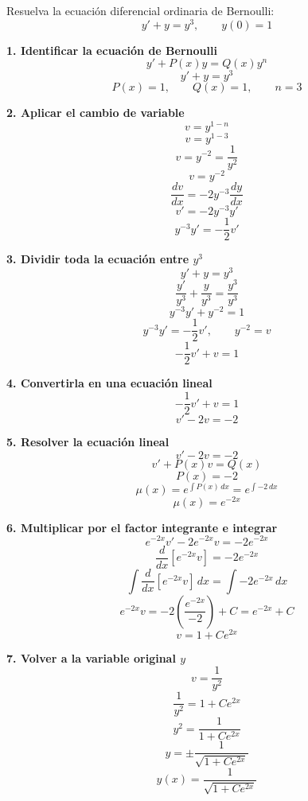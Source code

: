 \documentclass[11pt,a4paper]{article}
\newenvironment{solucion}[1][Solución Detallada]{%
    \vspace{1.5mm}%
    \noindent{\large\textbf{Solución:}}\par\vspace{1.5mm}%
}{%
    \par\vspace{3mm}%
}
\begin{document}
\vspace{3mm}

\begin{problema}[Problema 1.2]
Resuelva la ecuación diferencial ordinaria de Bernoulli:
\[
y' + y = y^3, \qquad y(0) = 1
\]
\end{problema}

\begin{solucion}

\textbf{\large 1. Identificar la ecuación de Bernoulli}
\[
\boxed{y' + P(x)y = Q(x)y^n}
\]
\[
y' + y = y^3
\]
\[
P(x) = 1, \qquad Q(x) = 1, \qquad n = 3
\]

\vspace{3.5mm}

\textbf{\large 2. Aplicar el cambio de variable}
\[
\boxed{v = y^{1-n}}
\]
\[
v = y^{1-3}
\]
\[
\boxed{v = y^{-2} = \frac{1}{y^2}}
\]
\[
v = y^{-2}
\]
\[
\frac{dv}{dx} = -2y^{-3} \frac{dy}{dx}
\]
\[
\boxed{v' = -2y^{-3}y'}
\]
\[
\boxed{y^{-3}y' = -\frac{1}{2}v'}
\]

\vspace{3.5mm}

\textbf{\large 3. Dividir toda la ecuación entre $y^3$}
\[
y' + y = y^3
\]
\[
\frac{y'}{y^3} + \frac{y}{y^3} = \frac{y^3}{y^3}
\]
\[
y^{-3}y' + y^{-2} = 1
\]
\[
y^{-3}y' = -\frac{1}{2}v', \qquad y^{-2} = v
\]
\[
-\frac{1}{2}v' + v = 1
\]

\vspace{3.5mm}

\textbf{\large 4. Convertirla en una ecuación lineal}
\[
-\frac{1}{2}v' + v = 1
\]
\[
\boxed{v' - 2v = -2}
\]

\vspace{3.5mm}

\textbf{\large 5. Resolver la ecuación lineal}
\[
v' - 2v = -2
\]
\[
v' + P(x)v = Q(x)
\]
\[
P(x) = -2
\]
\[
\mu(x) = e^{\int P(x)\,dx} = e^{\int -2\,dx}
\]
\[
\boxed{\mu(x) = e^{-2x}}
\]

\vspace{3.5mm}

\textbf{\large 6. Multiplicar por el factor integrante e integrar}
\[
e^{-2x}v' - 2e^{-2x}v = -2e^{-2x}
\]
\[
\frac{d}{dx}\left[e^{-2x}v\right] = -2e^{-2x}
\]
\[
\int \frac{d}{dx}\left[e^{-2x}v\right]\,dx = \int -2e^{-2x}\,dx
\]
\[
e^{-2x}v = -2\left(\frac{e^{-2x}}{-2}\right) + C = e^{-2x} + C
\]
\[
\boxed{v = 1 + C e^{2x}}
\]

\vspace{3.5mm}

\textbf{\large 7. Volver a la variable original $y$}
\[
v = \frac{1}{y^2}
\]
\[
\frac{1}{y^2} = 1 + C e^{2x}
\]
\[
y^2 = \frac{1}{1 + C e^{2x}}
\]
\[
y = \pm \frac{1}{\sqrt{1 + C e^{2x}}}
\]
\[
\boxed{y(x) = \frac{1}{\sqrt{1 + C e^{2x}}}}
\]


\end{solucion}
\end{document}
